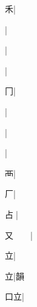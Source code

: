 \begin{multicols}{2}
{{\cjk{}{\cnsym{}　}{\cnsym{}　}禾}|{}\par
{\cjk{}{\cnsym{}　}{\cnsym{}　}{\cnsym{}　}}|{}\par
{\cjk{}{\cnsym{}　}{\cnsym{}　}{\cnsym{}　}}|{}\par
{}|{}\par
{\cjk{}{\cnsym{}　}{\cnsym{}　}冂}|{}\par
{}|{}\par
{\cjk{}{\cnsym{}　}{\cnsym{}　}{\cnsym{}　}}|{}\par
{\cjk{}{\cnsym{}　}{\cnsym{}　}{\cnsym{}　}}|{}\par
{\cjk{}{\cnsym{}　}{\cnsym{}　}襾}|{}\par
{\cjk{}{\cnsym{}　}{\cnsym{}　}厂}|{}\par
{\cjk{}{\cnsym{}　}占{\cnxb{}𠂭}}|{}\par
{\cjk{}又{\cnsym{}　}{\cnsym{}　}}|{}\par
{\cjk{}{\cnsym{}　}{\cnsym{}　}立}|{}\par
{\cjk{}{\cnsym{}　}{\cnsym{}　}立}|{\cjk{}韻}\par
{\cjk{}{\cnsym{}　}口立}|{}\par
}
\end{multicols}
